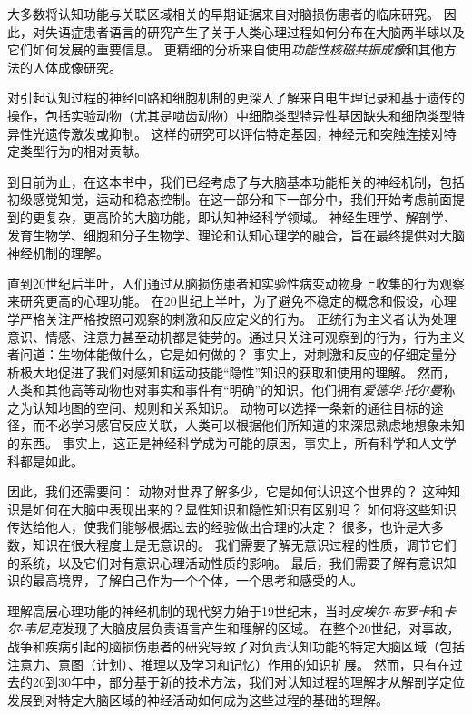 大多数将认知功能与关联区域相关的早期证据来自对脑损伤患者的临床研究。
因此，对失语症患者语言的研究产生了关于人类心理过程如何分布在大脑两半球以及它们如何发展的重要信息。
更精细的分析来自使用\textit{功能性核磁共振成像}和其他方法的人体成像研究。


对引起认知过程的神经回路和细胞机制的更深入了解来自电生理记录和基于遗传的操作，包括实验动物（尤其是啮齿动物）中细胞类型特异性基因缺失和细胞类型特异性光遗传激发或抑制。
这样的研究可以评估特定基因，神经元和突触连接对特定类型行为的相对贡献。


到目前为止，在这本书中，我们已经考虑了与大脑基本功能相关的神经机制，包括初级感觉知觉，运动和稳态控制。在这一部分和下一部分中，我们开始考虑前面提到的更复杂，更高阶的大脑功能，即认知神经科学领域。
神经生理学、解剖学、发育生物学、细胞和分子生物学、理论和认知心理学的融合，旨在最终提供对大脑神经机制的理解。


直到20世纪后半叶，人们通过从脑损伤患者和实验性病变动物身上收集的行为观察来研究更高的心理功能。
在20世纪上半叶，为了避免不稳定的概念和假设，心理学严格关注严格按照可观察的刺激和反应定义的行为。
正统行为主义者认为处理意识、情感、注意力甚至动机都是徒劳的。通过只关注可观察到的行为，行为主义者问道：生物体能做什么，它是如何做的？
事实上，对刺激和反应的仔细定量分析极大地促进了我们对感知和运动技能“隐性”知识的获取和使用的理解。
然而，人类和其他高等动物也对事实和事件有“明确”的知识。他们拥有\textit{爱德华$\cdot$托尔曼}称之为认知地图的空间、规则和关系知识。
动物可以选择一条新的通往目标的途径，而不必学习感官反应关联，人类可以根据他们所知道的来深思熟虑地想象未知的东西。
事实上，这正是神经科学成为可能的原因，事实上，所有科学和人文学科都是如此。


因此，我们还需要问：
动物对世界了解多少，它是如何认识这个世界的？
这种知识是如何在大脑中表现出来的？显性知识和隐性知识有区别吗？
如何将这些知识传达给他人，使我们能够根据过去的经验做出合理的决定？
很多，也许是大多数，知识在很大程度上是无意识的。
我们需要了解无意识过程的性质，调节它们的系统，以及它们对有意识心理活动性质的影响。
最后，我们需要了解有意识知识的最高境界，了解自己作为一个个体，一个思考和感受的人。


理解高层心理功能的神经机制的现代努力始于19世纪末，当时\textit{皮埃尔$\cdot$布罗卡}和\textit{卡尔$\cdot$韦尼克}发现了大脑皮层负责语言产生和理解的区域。
在整个20世纪，对事故，战争和疾病引起的脑损伤患者的研究导致了对负责认知功能的特定大脑区域（包括注意力、意图（计划）、推理以及学习和记忆）作用的知识扩展。
然而，只有在过去的20到30年中，部分基于新的技术方法，我们对认知过程的理解才从解剖学定位发展到对特定大脑区域的神经活动如何成为这些过程的基础的理解。


